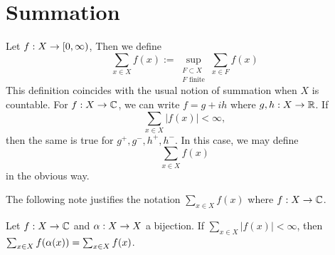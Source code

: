 \documentclass{book}
\begin{document}
\appendix

\chapter{Summation}

\begin{defn} \ld{}
	Let $f:X \rightarrow [0,\infty)$, Then we define $$\sum_{x \in X} f(x) := \sup_{\substack{F \subset X \\ F \text{ finite}}} \sum_{x \in F} f(x)$$ This definition coincides with the usual notion of summation when $X$ is countable. For $f:X \rightarrow \mathbb{C}$, we can write $f = g +ih$ where $g,h:X \rightarrow \mathbb{R}$. If $$\sum_{x \in X}|f(x)| < \infty,$$ then the same is true for $g^+,g^-,h^+,h^-$. In this case, we may define $$\sum_{x \in X} f(x)$$ in the obvious way.
\end{defn} 

The following note justifies the notation $\sum_{x \in X}f(x)$ where $f:X \rightarrow \mathbb{C}$.

\begin{note}
	Let $f:X \rightarrow \mathbb{C}$ and $\alpha:X \rightarrow X$ a bijection. If $\sum_{x \in X}|f(x)|< \infty$, then $\sum_{x \in X}f( \alpha (x)) = \sum_{x \in X}f(x) $.
\end{note}
\end{document}
